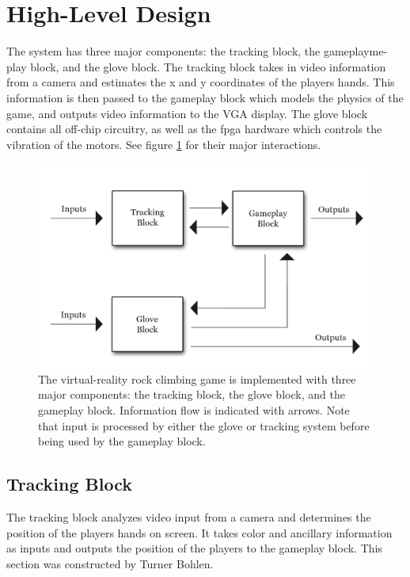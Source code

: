 \section{High-Level Design}
\label{sec:highlevel}

The system has three major components: the tracking block, the gameplayme-play
block, and the glove block. The tracking block takes in video information from a
camera and estimates the x and y coordinates of the players hands. This
information is then passed to the gameplay block which models the physics of the
game, and outputs video information to the VGA display. The glove block contains
all off-chip circuitry, as well as the fpga hardware which controls the
vibration of the motors. See figure \ref{fig:high} for their major interactions.

\begin{figure}
\centering
\includegraphics[scale=1]{img/high-level.png}
\caption{The virtual-reality rock climbing game is implemented with three major
components: the tracking block, the glove block, and the gameplay block.
Information flow is indicated with arrows. Note that input is processed by
either the glove or tracking system before being used by the gameplay block.}
\label{fig:high}
\end{figure}

\subsection{Tracking Block}

The tracking block analyzes video input from a camera and determines the
position of the players hands on screen. It takes color and ancillary
information as inputs and outputs the position of the players to the gameplay
block. This section was constructed by Turner Bohlen.

